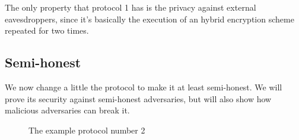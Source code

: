 The only property that protocol 1 has is the privacy against external eavesdroppers, since it's basically the execution of an hybrid encryption scheme repeated for two times.


\subsection{Semi-honest}
We now change a little the protocol to make it at least semi-honest. We will prove its security against semi-honest adversaries, but will also show how malicious adversaries can break it.

\begin{figure}
    \caption{The example protocol number 2}
    \label{prot_dummy_2}
\end{figure}

